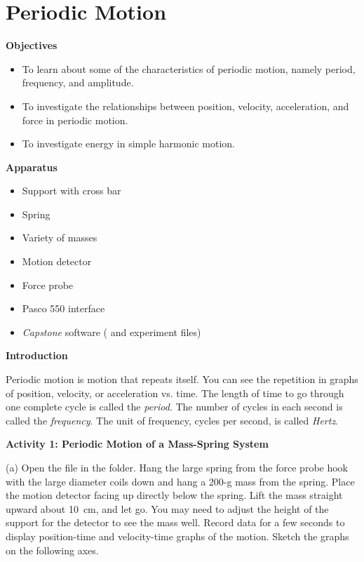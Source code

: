 \section{Periodic Motion}

\makelabheader %

\medskip
\textbf{Objectives }
\begin{itemize}[nosep]
\item To learn about some of the characteristics of periodic motion, namely period, frequency, and amplitude. 
\item To investigate the relationships between position, velocity, acceleration, and force in periodic motion. 
\item To investigate energy in simple harmonic motion.
\end{itemize}

\medskip
\textbf{Apparatus} 
\begin{itemize}[nosep]
\item Support with cross bar
\item Spring
\item Variety of masses 
\item Motion detector 
\item Force probe
\item Pasco 550 interface
\item \textit{Capstone} software ( and  experiment files)
\end{itemize}

\medskip
\textbf{Introduction }

Periodic motion is motion that repeats itself. You can see the repetition in
graphs of position, velocity, or acceleration vs. time. The length of time to
go through one complete cycle is called the \textit{period}. The
number of cycles in each second is called the \textit{frequency}. The unit of frequency,
cycles per second, is called \textit{Hertz}.

\bigskip
\textbf{Activity 1: Periodic Motion of a Mass-Spring System} 

(a) Open the file  in the \filename{\coursefolder} folder. Hang the large spring from the force probe hook with the large diameter coils down and hang a 200-g mass from the spring.  Place the motion detector facing up directly below the spring. Lift the mass straight upward about 10~cm, and let go. 
You may need to adjust the height of the support for the detector to see the mass well. 
Record data for a few seconds to display position-time and 
velocity-time graphs of the motion. Sketch the graphs on the following axes.


